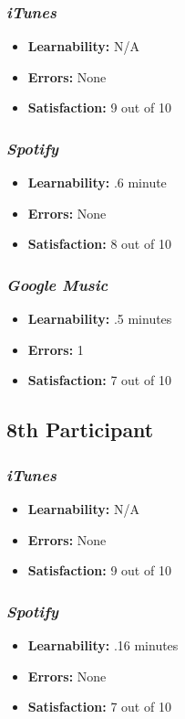 \documentclass{article}
\begin{document}
{\begin{multicols}{2}
\subsubsection{\it iTunes}
\begin{itemize}
	\item {\bf Learnability:} N/A
	\item {\bf Errors:}  None
	\item {\bf Satisfaction:} 9 out of 10 
\end{itemize}

\subsubsection{\it Spotify}
\begin{itemize}
	\item {\bf Learnability:}  .6 minute
	\item {\bf Errors:} None
	\item {\bf Satisfaction:} 8 out of 10 
\end{itemize}

\subsubsection{\it Google Music}
\begin{itemize}
\item {\bf Learnability:} .5 minutes
	\item {\bf Errors:} 1
	\item {\bf Satisfaction:} 7 out of 10 
\end{itemize}

\subsection{8th Participant}

\subsubsection{\it iTunes}
\begin{itemize}
	\item {\bf Learnability:} N/A
	\item {\bf Errors:} None
	\item {\bf Satisfaction:} 9 out of 10 
\end{itemize}

\subsubsection{\it Spotify}
\begin{itemize}
	\item {\bf Learnability:} .16 minutes
	\item {\bf Errors:} None
	\item {\bf Satisfaction:} 7 out of 10 
\end{itemize}


\end{multicols}}
\end{document}
